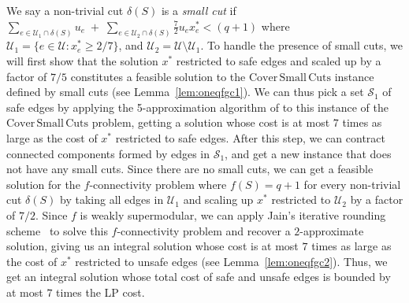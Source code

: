 \documentclass[11pt]{article}
\newcommand{\safe}{\mathscr{S}}
\newcommand{\unsafe}{\mathscr{U}}
\newcommand\ASC{\mathrm{Cover\,Small\,Cuts}}
\begin{document}
{We say a non-trivial cut $\delta(S)$ is a {\em small cut} if $\sum_{e\in \unsafe_1\cap\delta(S)}u_e \;+\; \sum_{e\in \unsafe_2\cap\delta(S)}\frac{7}{2} u_ex^*_e < (q+1)$ where $\unsafe_{1} = \{e\in \unsafe : x^*_e \geq 2/7\}$, and $\unsafe_{2} = \unsafe \setminus \unsafe_1$.
To handle the presence of small cuts, we will first show that the solution $x^*$ restricted to safe edges and scaled up by a factor of $7/5$ constitutes a feasible solution to the $\ASC$ instance defined by small cuts (see Lemma~\ref{lem:oneqfgc1}). We can thus pick a set $\safe_1$ of safe edges by applying the 5-approximation algorithm of \cite{B2023,BCGI24} to this instance of the $\ASC$ problem, getting a solution whose cost is at most $7$ {times} as large as the cost of $x^*$ restricted to safe edges. After this step, we can contract connected components formed by edges in $\safe_1$, and get a new instance that does not have any small cuts. 
Since there are no small cuts, we can get a feasible solution for the $f$-connectivity problem where $f(S) = q+1$ for every non-trivial cut $\delta(S)$ by 
taking all edges in $\unsafe_1$ and scaling up $x^*$ restricted to $\unsafe_2$ by a factor of $7/2$.
Since $f$ is weakly supermodular, we can apply Jain's iterative rounding scheme~\cite{Jain01} to solve this $f$-connectivity problem and recover a $2$-approximate solution, giving us an integral solution whose cost is at most $7$ {times} as large as the cost of $x^*$ restricted to unsafe edges (see Lemma~\ref{lem:oneqfgc2}).
Thus, we get an integral solution whose total cost of safe and unsafe edges is bounded by at most $7$ times the LP cost.

}
\end{document}
